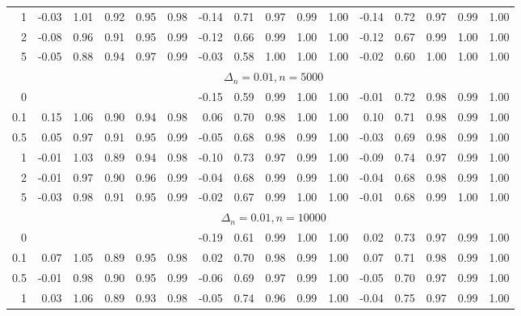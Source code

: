 \documentclass{article}
\theoremstyle{plain}
\theoremstyle{definition}
\theoremstyle{remark}
\begin{document}
\begin{appendix}
{\begin{table}[ht]
\begin{tabular}{r|rrrrr|rrrrr|rrrrr}
  1 & -0.03 & 1.01 & 0.92 & 0.95 & 0.98 & -0.14 & 0.71 & 0.97 & 0.99 & 1.00 & -0.14 & 0.72 & 0.97 & 0.99 & 1.00 \\ 
  2 & -0.08 & 0.96 & 0.91 & 0.95 & 0.99 & -0.12 & 0.66 & 0.99 & 1.00 & 1.00 & -0.12 & 0.67 & 0.99 & 1.00 & 1.00 \\ 
  5 & -0.05 & 0.88 & 0.94 & 0.97 & 0.99 & -0.03 & 0.58 & 1.00 & 1.00 & 1.00 & -0.02 & 0.60 & 1.00 & 1.00 & 1.00 \\ 
   \midrule
   &\multicolumn{15}{c}{$\Delta_n=0.01, n= 5000$}
   \\
 0 &  &  &  &  &  & -0.15 & 0.59 & 0.99 & 1.00 & 1.00 & -0.01 & 0.72 & 0.98 & 0.99 & 1.00 \\ 
  0.1 & 0.15 & 1.06 & 0.90 & 0.94 & 0.98 & 0.06 & 0.70 & 0.98 & 1.00 & 1.00 & 0.10 & 0.71 & 0.98 & 0.99 & 1.00 \\ 
  0.5 & 0.05 & 0.97 & 0.91 & 0.95 & 0.99 & -0.05 & 0.68 & 0.98 & 0.99 & 1.00 & -0.03 & 0.69 & 0.98 & 0.99 & 1.00 \\ 
  1 & -0.01 & 1.03 & 0.89 & 0.94 & 0.98 & -0.10 & 0.73 & 0.97 & 0.99 & 1.00 & -0.09 & 0.74 & 0.97 & 0.99 & 1.00 \\ 
  2 & -0.01 & 0.97 & 0.90 & 0.96 & 0.99 & -0.04 & 0.68 & 0.99 & 0.99 & 1.00 & -0.04 & 0.68 & 0.98 & 0.99 & 1.00 \\ 
  5 & -0.03 & 0.98 & 0.91 & 0.95 & 0.99 & -0.02 & 0.67 & 0.99 & 1.00 & 1.00 & -0.01 & 0.68 & 0.99 & 1.00 & 1.00 \\ 
   \midrule
   &\multicolumn{15}{c}{$\Delta_n=0.01, n= 10000$}
   \\
  0 &  &  &  &  &  & -0.19 & 0.61 & 0.99 & 1.00 & 1.00 & 0.02 & 0.73 & 0.97 & 0.99 & 1.00 \\ 
  0.1 & 0.07 & 1.05 & 0.89 & 0.95 & 0.98 & 0.02 & 0.70 & 0.98 & 0.99 & 1.00 & 0.07 & 0.71 & 0.98 & 0.99 & 1.00 \\ 
  0.5 & -0.01 & 0.98 & 0.90 & 0.95 & 0.99 & -0.06 & 0.69 & 0.97 & 0.99 & 1.00 & -0.05 & 0.70 & 0.97 & 0.99 & 1.00 \\ 
  1 & 0.03 & 1.06 & 0.89 & 0.93 & 0.98 & -0.05 & 0.74 & 0.96 & 0.99 & 1.00 & -0.04 & 0.75 & 0.97 & 0.99 & 1.00 \\ 

\end{tabular}
\end{table}}
\end{appendix}
\end{document}
